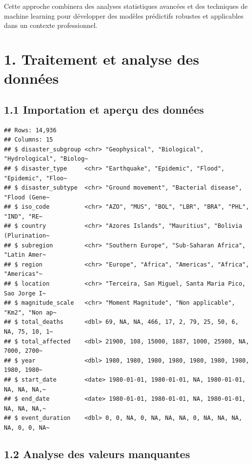 \documentclass[
]{article}
\begin{document}
Cette approche combinera des analyses statistiques avancées et des
techniques de machine learning pour développer des modèles prédictifs
robustes et applicables dans un contexte professionnel.

\section{1. Traitement et analyse des
données}\label{traitement-et-analyse-des-donnuxe9es}

\subsection{1.1 Importation et aperçu des
données}\label{importation-et-aperuxe7u-des-donnuxe9es}

\begin{verbatim}
## Rows: 14,936
## Columns: 15
## $ disaster_subgroup <chr> "Geophysical", "Biological", "Hydrological", "Biolog~
## $ disaster_type     <chr> "Earthquake", "Epidemic", "Flood", "Epidemic", "Floo~
## $ disaster_subtype  <chr> "Ground movement", "Bacterial disease", "Flood (Gene~
## $ iso_code          <chr> "AZO", "MUS", "BOL", "LBR", "BRA", "PHL", "IND", "RE~
## $ country           <chr> "Azores Islands", "Mauritius", "Bolivia (Plurination~
## $ subregion         <chr> "Southern Europe", "Sub-Saharan Africa", "Latin Amer~
## $ region            <chr> "Europe", "Africa", "Americas", "Africa", "Americas"~
## $ location          <chr> "Terceira, San Miguel, Santa Maria Pico, Sao Jorge I~
## $ magnitude_scale   <chr> "Moment Magnitude", "Non applicable", "Km2", "Non ap~
## $ total_deaths      <dbl> 69, NA, NA, 466, 17, 2, 79, 25, 50, 6, NA, 75, 10, 1~
## $ total_affected    <dbl> 21900, 108, 15000, 1887, 1000, 25980, NA, 7000, 2700~
## $ year              <dbl> 1980, 1980, 1980, 1980, 1980, 1980, 1980, 1980, 1980~
## $ start_date        <date> 1980-01-01, 1980-01-01, NA, 1980-01-01, NA, NA, NA,~
## $ end_date          <date> 1980-01-01, 1980-01-01, NA, 1980-01-01, NA, NA, NA,~
## $ event_duration    <dbl> 0, 0, NA, 0, NA, NA, NA, 0, NA, NA, NA, NA, 0, 0, NA~
\end{verbatim}

\subsection{1.2 Analyse des valeurs
manquantes}\label{analyse-des-valeurs-manquantes}
\end{document}
